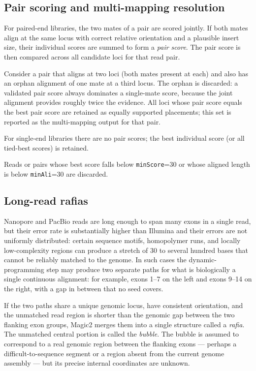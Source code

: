 \documentclass[11pt]{article}
\begin{document}
\subsection{Pair scoring and multi-mapping resolution}
\label{sec:pair_scoring}

For paired-end libraries, the two mates of a pair are scored jointly.
If both mates align at the same locus with correct relative
orientation and a plausible insert size, their individual scores are
summed to form a \emph{pair score}.
The pair score is then compared across all candidate loci for that
read pair.

Consider a pair that aligns at two loci (both mates present at each)
and also has an orphan alignment of one mate at a third locus.
The orphan is discarded: a validated pair score always dominates a
single-mate score, because the joint alignment provides roughly
twice the evidence.
All loci whose pair score equals the best pair score are retained as
equally supported placements; this set is reported as the
multi-mapping output for that pair.

For single-end libraries there are no pair scores; the best
individual score (or all tied-best scores) is retained.

Reads or pairs whose best score falls below \texttt{minScore}=30
or whose aligned length is below \texttt{minAli}=30 are discarded.

\subsection{Long-read rafias}
\label{sec:rafias}

Nanopore and PacBio reads are long enough to span many exons in a
single read, but their error rate is substantially higher than
Illumina and their errors are not uniformly distributed: certain
sequence motifs, homopolymer runs, and locally low-complexity
regions can produce a stretch of 30 to several hundred bases that
cannot be reliably matched to the genome.
In such cases the dynamic-programming step may produce two separate
paths for what is biologically a single continuous alignment: for
example, exons 1--7 on the left and exons 9--14 on the right, with
a gap in between that no seed covers.

If the two paths share a unique genomic locus, have consistent
orientation, and the unmatched read region is shorter than the
genomic gap between the two flanking exon groups, Magic2 merges
them into a single structure called a \emph{rafia}.
The unmatched central portion is called the \emph{bubble}.
The bubble is assumed to correspond to a real genomic region between
the flanking exons --- perhaps a difficult-to-sequence segment or
a region absent from the current genome assembly --- but its
precise internal coordinates are unknown.
\end{document}
